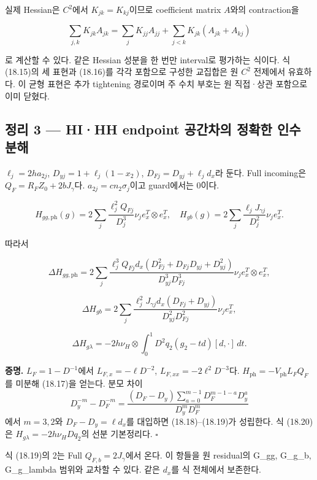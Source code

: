 실제 Hessian은 \(C^2\)에서 \(K_{jk}=K_{kj}\)이므로 coefficient matrix
\(A\)와의 contraction을

\[
\sum_{j,k}K_{jk}A_{jk}
=\sum_jK_{jj}A_{jj}
+\sum_{j<k}K_{jk}(A_{jk}+A_{kj})
\tag{18.16}
\]

로 계산할 수 있다. 같은 Hessian 성분을 한 번만 interval로 평가하는
식이다. 식 (18.15)의 세 표현과 (18.16)를 각각 포함으로 구성한 교집합은
원 \(C^2\) 전제에서 유효하다. 이 균형 표현은 추가 tightening 경로이며 주
수치 부호는 원 직접·상관 포함으로 이미 닫혔다.

\hypertarget{uxc815uxb9ac-3-hihh-endpoint-uxacf5uxac04uxcc28uxc758-uxc815uxd655uxd55c-uxc778uxc218-uxbd84uxd574}{%
\subsection{정리 3 --- HI·HH endpoint 공간차의 정확한 인수
분해}\label{uxc815uxb9ac-3-hihh-endpoint-uxacf5uxac04uxcc28uxc758-uxc815uxd655uxd55c-uxc778uxc218-uxbd84uxd574}}

\(\ell_j=2ha_{2j}\), \(D_{yj}=1+\ell_j(1-x_2)\),
\(D_{Fj}=D_{yj}+\ell_jd_x\)라 둔다. Full incoming은
\(Q_F=R_FZ_0+2bJ_\gamma\)다. \(a_{2j}=cn_2\sigma_j\)이고 guard에서는
0이다.

\[
H_{gg,\mathrm{ph}}(g)
=2\sum_j\frac{\ell_j^2Q_{Fj}}{D_j^3}
\nu_j e_x^T\otimes e_x^T,\quad
H_{gb}(g)=2\sum_j\frac{\ell_jJ_{\gamma j}}{D_j^2}
\nu_j e_x^T.
\tag{18.17}
\]

따라서

\[
\boxed{
\Delta H_{gg,\mathrm{ph}}
=2\sum_j
\frac{\ell_j^3Q_{Fj}d_x(D_{Fj}^2+D_{Fj}D_{yj}+D_{yj}^2)}
{D_{yj}^3D_{Fj}^3}
\nu_j e_x^T\otimes e_x^T,
}
\tag{18.18}
\]

\[
\boxed{
\Delta H_{gb}
=2\sum_j
\frac{\ell_j^2J_{\gamma j}d_x(D_{Fj}+D_{yj})}
{D_{yj}^2D_{Fj}^2}\nu_j e_x^T,
}
\tag{18.19}
\]

\[
\boxed{
\Delta H_{g\lambda}
=-2h\nu_H\otimes
\int_0^1D^2q_2(g_2-td)[d,\cdot]\,dt.
}
\tag{18.20}
\]

\textbf{증명.} \(L_F=1-D^{-1}\)에서 \(L_{F,x}=-\ell D^{-2}\),
\(L_{F,xx}=-2\ell^2D^{-3}\)다.
\(H_{\mathrm{ph}}=-V_{\mathrm{ph}}L_FQ_F\)를 미분해 (18.17)을 얻는다.
분모 차이 \[
D_y^{-m}-D_F^{-m}
=\frac{(D_F-D_y)\sum_{a=0}^{m-1}D_F^{m-1-a}D_y^a}
{D_y^mD_F^m}
\] 에서 \(m=3,2\)와 \(D_F-D_y=\ell d_x\)를 대입하면 (18.18)--(18.19)가
성립한다. 식 (18.20)은 \(H_{g\lambda}=-2h\nu_HDq_2\)의 선분 기본정리다.
\(\square\)

식 (18.19)의 2는 Full \(Q_{F,b}=2J_\gamma\)에서 온다. 이 항들을 원
residual의 G\_gg, G\_g\_b, G\_g\_lambda 범위와 교차할 수 있다. 같은
\(d_x\)를 식 전체에서 보존한다.

